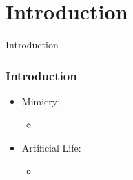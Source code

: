 \section{Introduction}

\frame
{
	\begin{center}
		\LARGE Introduction
	\end{center}
}

\frame
{
	\frametitle{Introduction}
	
	\begin{itemize}
		\item Mimicry:
			\begin{itemize}
				\item 
			\end{itemize}
		\item Artificial Life:
			\begin{itemize}
				\item 
			\end{itemize}
	\end{itemize}
}
